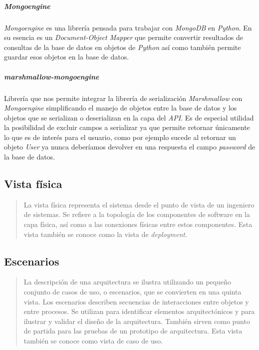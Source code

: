 \documentclass[12pt,a4paper,]{scrartcl}
\let\oldsubparagraph\subparagraph
\renewcommand{\subparagraph}[1]{\oldsubparagraph{#1}\mbox{}}
\begin{document}
\hypertarget{mongoengine}{%
\subparagraph{\texorpdfstring{\emph{Mongoengine}}{Mongoengine}}\label{mongoengine}}

\emph{Mongoengine} es una librería pensada para trabajar con \emph{MongoDB} en \emph{Python}. En su esencia es un \emph{Document-Object Mapper} que permite convertir resultados de consultas de la base de datos en objetos de \emph{Python} así como también permite guardar esos objetos en la base de datos.

\hypertarget{marshmallow-mongoengine}{%
\subparagraph{\texorpdfstring{\emph{marshmallow-mongoengine}}{marshmallow-mongoengine}}\label{marshmallow-mongoengine}}

Librería que nos permite integrar la librería de serialización \emph{Marshmallow} con \emph{Mongoengine} simplificando el manejo de objetos entre la base de datos y los objetos que se serializan o deserializan en la capa del \emph{API}. Es de especial utilidad la posibilidad de excluir campos a serializar ya que permite retornar únicamente lo que es de interés para el usuario, como por ejemplo sucede al retornar un objeto \emph{User} ya nunca deberíamos devolver en una respuesta el campo \emph{password} de la base de datos.

\hypertarget{vista-fuxedsica}{%
\subsection{Vista física}\label{vista-fuxedsica}}

\begin{quote}
La vista física representa el sistema desde el punto de vista de un ingeniero de sistemas.
Se refiere a la topología de los componentes de software en la capa física, así como a las conexiones físicas entre estos componentes.
Esta vista también se conoce como la vista de \emph{deployment}.
\end{quote}

\hypertarget{escenarios}{%
\subsection{Escenarios}\label{escenarios}}

\begin{quote}
La descripción de una arquitectura se ilustra utilizando un pequeño conjunto de casos de uso, o escenarios, que se convierten en una quinta vista.
Los escenarios describen secuencias de interacciones entre objetos y entre procesos.
Se utilizan para identificar elementos arquitectónicos y para ilustrar y validar el diseño de la arquitectura.
También sirven como punto de partida para las pruebas de un prototipo de arquitectura.
Esta vista también se conoce como vista de caso de uso.
\end{quote}
\end{document}
